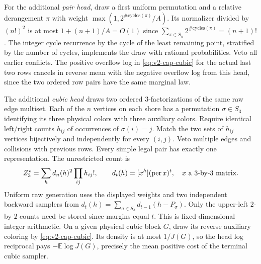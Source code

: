 For the additional \emph{pair head}, draw a first uniform permutation and
a relative derangement $\pi$ with weight
$\max(1,2^{\#\mathrm{cycles}(\pi)}/A)$. Its normalizer divided by
$(n!)^2$ is at most $1+(n+1)/A=O(1)$ since
$\sum_{\pi\in S_n}2^{\#\mathrm{cycles}(\pi)}=(n+1)!$.
The integer cycle recurrence by the cycle of the least remaining point,
stratified by the number of cycles, implements the draw with rational
probabilities. Veto all earlier conflicts. The positive overflow log in
\eqref{eq:v2-cap-cubic} for the actual last two rows cancels in reverse
mean with the negative overflow log from this head, since the two
ordered row pairs have the same marginal law.

The additional \emph{cubic head} draws two ordered 3-factorizations of
the same raw edge multiset. Each of the $n$ vertices on each shore has a
permutation $\sigma\in S_3$ identifying its three physical colors with
three auxiliary colors. Require identical left/right counts
$h_{ij}$ of occurrences of $\sigma(i)=j$. Match the two sets of
$h_{ij}$ vertices bijectively and independently for every $(i,j)$.
Veto multiple edges and collisions with previous rows. Every simple
legal pair has exactly one representation. The unrestricted count is
\begin{equation}\label{eq:v2-cubic-Z}
 Z_3^\star=\sum_h d_n(h)^2\prod_{ij}h_{ij}!,\qquad
 d_t(h)=[x^h](\operatorname{per} x)^t,\quad x\text{ a }3\text{-by-}3\text{ matrix}.
\end{equation}
Uniform raw generation uses the displayed weights and two independent
backward samplers from $d_t(h)=\sum_{\sigma\in S_3}d_{t-1}(h-P_\sigma)$.
Only the upper-left $2$-by-$2$ counts need be stored since margins equal
$t$. This is fixed-dimensional integer arithmetic. On a given physical
cubic block $G$, draw its reverse auxiliary coloring by
\eqref{eq:v2-cap-cubic}. Its density is at most $1/J(G)$, so the
head log reciprocal pays $-\mathbb E\log J(G)$, precisely the mean
positive cost of the terminal cubic sampler.


